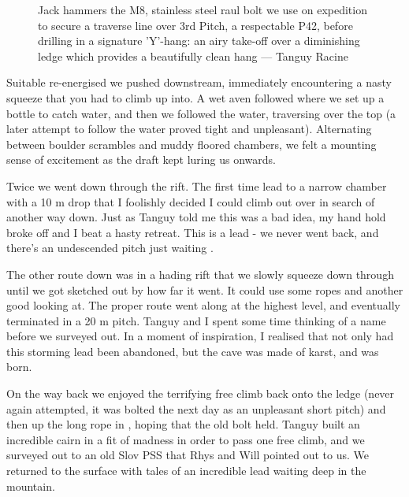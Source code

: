  
 \begin{figure}[t!]
\checkoddpage \ifoddpage \forcerectofloat \else \forceversofloat \fi
\centering
{}
\caption{Jack hammers the M8, stainless steel raul bolt we use on expedition to secure a traverse line over \protect{} 3rd Pitch, a respectable P42, before drilling in a signature 'Y'-hang: an airy take-off over a diminishing ledge which provides a beautifully clean hang --- Tanguy Racine  }
\label{bolt M8}
\end{figure}

Suitable re-energised we pushed downstream, immediately encountering a nasty squeeze that you had to climb up into. A wet aven followed where we set up a bottle to catch water, and then we followed the water, traversing over the top (a later attempt to follow the water proved tight and unpleasant). Alternating between boulder scrambles and muddy floored chambers, we felt a mounting sense of excitement as the draft kept luring us onwards.
 
Twice we went down through the rift. The first time lead to a narrow chamber with a 10 m drop that I foolishly decided I could climb out over in search of another way down. Just as Tanguy told me this was a bad idea, my hand hold broke off and I beat a hasty retreat. This is a lead - we never went back, and there’s an undescended pitch just waiting .
 
The other route down was in a hading rift that we slowly squeeze down through until we got sketched out by how far it went. It could use some ropes and another good looking at. The proper route went along at the highest level, and eventually terminated in a 20 m pitch. Tanguy and I spent some time thinking of a name before we surveyed out. In a moment of inspiration, I realised that not only had this storming lead been abandoned, but the cave was made of karst, and  was born.
 
On the way back we enjoyed the terrifying free climb back onto the ledge (never again attempted, it was bolted the next day as an unpleasant short pitch) and then up the long rope in , hoping that the old bolt held. Tanguy built an incredible cairn in a fit of madness in order to pass one free climb, and we surveyed out to an old Slov PSS that Rhys and Will pointed out to us. We returned to the surface with tales of an incredible lead waiting deep in the mountain.

